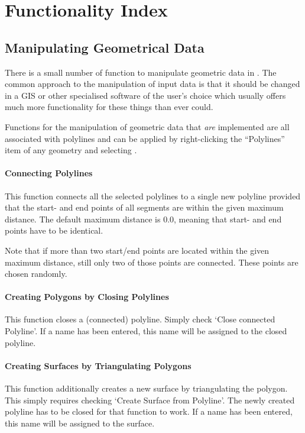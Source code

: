 \chapter{Functionality Index}

\section{Manipulating Geometrical Data}

There is a small number of function to manipulate geometric data in \ogs. The common approach to the manipulation of \ogs input data is that it should be changed in a GIS or other specialised software of the user's choice which usually offers much more functionality for these things than \ogs ever could.

Functions for the manipulation of geometric data that \emph{are} implemented are all associated with polylines and can be applied by right-clicking the ``Polylines'' item of any geometry and selecting .

\subsubsection{Connecting Polylines}
This function connects all the selected polylines to a single new polyline provided that the start- and end points of all segments are within the given maximum distance. The default maximum distance is $0.0$, meaning that start- and end points have to be identical.

Note that if more than two start/end points are located within the given maximum distance, still only two of those points are connected. These points are chosen randomly.

\subsubsection{Creating Polygons by Closing Polylines}
This function closes a (connected) polyline. Simply check `Close connected Polyline'. If a name has been entered, this name will be assigned to the closed polyline.

\subsubsection{Creating Surfaces by Triangulating Polygons}
This function additionally creates a new surface by triangulating the polygon. This simply requires checking `Create Surface from Polyline'. The newly created polyline has to be closed for that function to work. If a name has been entered, this name will be assigned to the surface.

